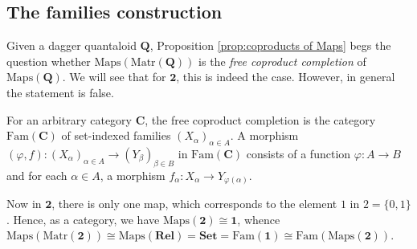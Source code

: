 \documentclass[12pt]{tac}
\theoremstyle{definition}
\theoremstyle{remark}
\newcommand{\<}{\langle}
\renewcommand{\>}{\rangle}
\renewcommand{\:}{\colon}
\begin{document}
\subsection{The families construction}
Given a dagger quantaloid $\mathbf Q$, Proposition \ref{prop:coproducts of Maps} begs the question whether $\mathrm{Maps}(\mathrm{Matr}(\mathbf Q))$ is the \emph{free coproduct completion} of $\mathrm{Maps}(\mathbf Q)$. We will see that for $\mathbf 2$, this is indeed the case. However, in general the statement is false.

For an arbitrary category $\mathbf C$, the free coproduct completion is the category $\mathrm{Fam}(\mathbf C)$ of set-indexed families $(X_\alpha)_{\alpha\in A}$. A morphism $(\varphi,f):(X_\alpha)_{\alpha\in A}\to(Y_\beta)_{\beta\in B}$ in $\mathrm{Fam}(\mathbf C)$ consists of a function $\varphi:A\to B$ and for each $\alpha\in A$, a morphism $f_\alpha:X_\alpha\to Y_{\varphi(\alpha)}$.

Now in $\mathbf 2$, there is only one map, which corresponds to the element $1$ in $2=\{0,1\}$. Hence, as a category, we have $\mathrm{Maps}(\mathbf 2)\cong\mathbf 1$, whence $\mathrm{Maps}(\mathrm{Matr}(\mathbf 2))\cong\mathrm{Maps}(\mathbf{Rel})=\mathbf{Set}=\mathrm{Fam}(\mathbf 1)\cong\mathrm{Fam}(\mathrm{Maps}(\mathbf 2))$.
\end{document}
